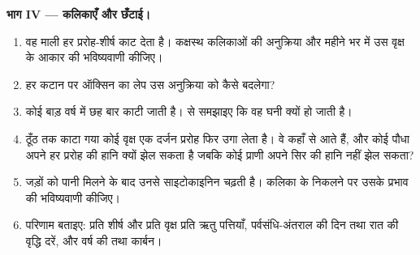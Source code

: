 \begin{problem}
\medskip
\noindent\textbf{भाग IV --- कलिकाएँ और छँटाई।}
\begin{enumerate}[resume]
  \item वह माली हर प्ररोह-शीर्ष काट देता है। कक्षस्थ कलिकाओं की
        अनुक्रिया और महीने भर में उस वृक्ष के आकार की भविष्यवाणी कीजिए।
  \item हर कटान पर ऑक्सिन का लेप उस अनुक्रिया को कैसे बदलेगा?
  \item कोई बाड़ वर्ष में छह बार काटी जाती है।  से
        समझाइए कि वह घनी क्यों हो जाती है।
  \item ठूँठ तक काटा गया कोई वृक्ष एक दर्जन प्ररोह फिर उगा लेता है। वे
        कहाँ से आते हैं, और कोई पौधा अपने हर प्ररोह की हानि क्यों झेल
        सकता है जबकि कोई प्राणी अपने सिर की हानि नहीं झेल सकता?
  \item जड़ों को पानी मिलने के बाद उनसे साइटोकाइनिन चढ़ती है।
        कलिका के निकलने पर उसके प्रभाव की भविष्यवाणी कीजिए।
  \item परिणाम बताइए: प्रति शीर्ष और प्रति वृक्ष प्रति ऋतु पत्तियाँ,
        पर्वसंधि-अंतराल की दिन तथा रात की वृद्धि दरें, और वर्ष की
         तथा कार्बन।
\end{enumerate}
\end{problem}

